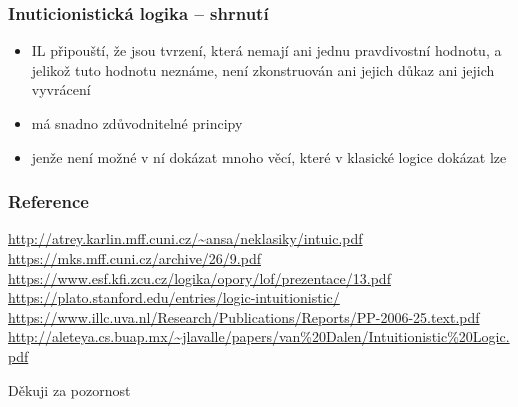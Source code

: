 \documentclass[aspectratio=169]{beamer}
\begin{document}
\begin{frame}
\frametitle{Inuticionistická logika -- shrnutí}
\begin{itemize}
\item IL připouští, že jsou tvrzení, která nemají ani jednu pravdivostní hodnotu, a jelikož tuto hodnotu neznáme, není zkonstruován ani jejich důkaz ani jejich vyvrácení
\item má snadno zdůvodnitelné principy
\item jenže není možné v ní dokázat mnoho věcí, které v klasické logice dokázat lze

\end{itemize}
\end{frame}




\begin{frame}
\frametitle{Reference}
\footnotesize{
\begin{thebibliography}{99}
 \url{http://atrey.karlin.mff.cuni.cz/~ansa/neklasiky/intuic.pdf}
 \url{https://mks.mff.cuni.cz/archive/26/9.pdf}
 \url{https://www.esf.kfi.zcu.cz/logika/opory/lof/prezentace/13.pdf}
 \url{https://plato.stanford.edu/entries/logic-intuitionistic/}
 \url{https://www.illc.uva.nl/Research/Publications/Reports/PP-2006-25.text.pdf} 
 \url{http://aleteya.cs.buap.mx/~jlavalle/papers/van\%20Dalen/Intuitionistic\%20Logic.pdf}
\end{thebibliography}
}
\end{frame}





\begin{frame}
\Huge{\centerline{Děkuji za pozornost}}
\end{frame}
\end{document}
